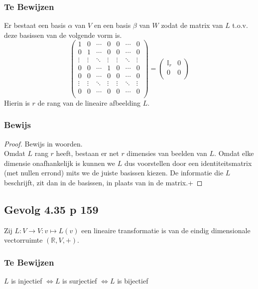 \documentclass[lineaire_algebra_oplossingen.tex]{subfiles}
\begin{document}
\subsubsection*{Te Bewijzen}
Er bestaat een basis $\alpha$ van $V$ en een basis $\beta$ van $W$ zodat de matrix van $L$ t.o.v. deze basissen van de volgende vorm is.
\[
\begin{pmatrix}
1 & 0 & \cdots & 0 & 0 & \cdots & 0\\
0 & 1 & \cdots & 0 & 0 & \cdots & 0\\
\vdots & \vdots & \ddots & \vdots & \vdots & \ddots & \vdots\\
0 & 0 & \cdots & 1 & 0 & \cdots & 0\\
0 & 0 & \cdots & 0 & 0 & \cdots & 0\\
\vdots & \vdots & \ddots & \vdots & \vdots & \ddots & \vdots\\
0 & 0 & \cdots & 0 & 0 & \cdots & 0\\
\end{pmatrix}
=
\begin{pmatrix}
\mathbb{I}_r & 0\\
0 & 0\\
\end{pmatrix}
\]
Hierin is $r$ de rang van de lineaire afbeelding $L$.

\subsubsection*{Bewijs}
\begin{proof}
Bewijs in woorden.\\
Omdat $L$ rang $r$ heeft, bestaan er net $r$ dimensies van beelden van $L$. Omdat elke dimensie onafhankelijk is kunnen we $L$ dus voorstellen door een identiteitsmatrix (met nullen errond) mits we de juiste basissen kiezen. De informatie die $L$ beschrijft, zit dan in de basissen, in plaats van in de matrix.+
\end{proof}


\subsection{Gevolg 4.35 p 159}
\label{4.35}
Zij $L: V\rightarrow V : v\mapsto L(v)$ een lineaire transformatie is van de eindig dimensionale vectorruimte $(\mathbb{R},V,+)$.
\subsubsection*{Te Bewijzen}
\begin{center}
$L$ is injectief $\Leftrightarrow L$ is surjectief $\Leftrightarrow L$ is bijectief
\end{center}
\end{document}
